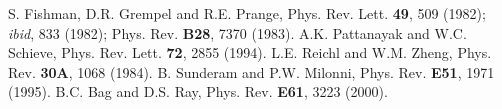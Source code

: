 \newpage

\begin{thebibliography}{99}
 S. Fishman, D.R. Grempel and R.E. Prange,
Phys. Rev. Lett. {\bf 49}, 509 (1982); {\it ibid}, 833 (1982);
Phys. Rev. {\bf B28}, 7370 (1983).
 A.K. Pattanayak and W.C. Schieve, Phys. Rev. Lett. {\bf 72}, 2855 (1994). 
 L.E. Reichl and W.M. Zheng, Phys. Rev. {\bf 30A}, 1068 (1984).
 B. Sunderam and P.W. Milonni, Phys. Rev. {\bf E51}, 1971  
(1995).
 B.C. Bag and D.S. Ray, Phys. Rev. {\bf E61}, 3223 (2000). 
\end{thebibliography}













